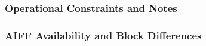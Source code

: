 \documentclass[11pt, a4paper, twoside]{report}
\begin{document}

\subsubsection{Operational Constraints and Notes}
\label{sec:C4-S3-S5-S4}



\subsubsection{AIFF Availability and Block Differences}
\label{sec:C4-S3-S5-S5}
\end{document}
